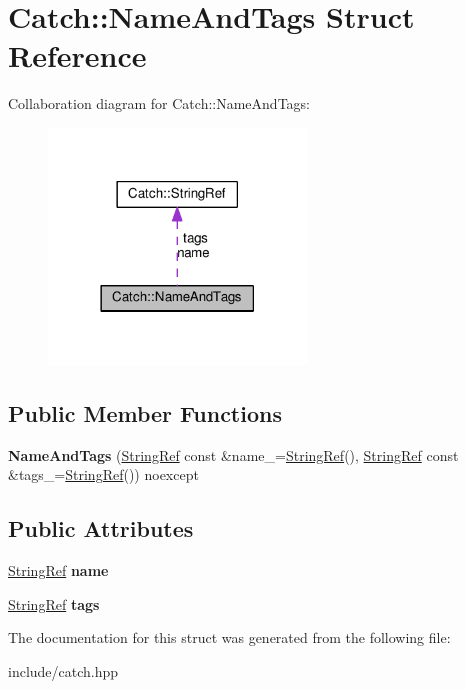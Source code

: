 \hypertarget{structCatch_1_1NameAndTags}{}\section{Catch\+:\+:Name\+And\+Tags Struct Reference}
\label{structCatch_1_1NameAndTags}


Collaboration diagram for Catch\+:\+:Name\+And\+Tags\+:
\nopagebreak
\begin{figure}[H]
\begin{center}
\leavevmode
\includegraphics[width=194pt]{structCatch_1_1NameAndTags__coll__graph}
\end{center}
\end{figure}
\subsection*{Public Member Functions}
\begin{DoxyCompactItemize}
\item 
{\bfseries Name\+And\+Tags} (\hyperlink{classCatch_1_1StringRef}{String\+Ref} const \&name\+\_\+=\hyperlink{classCatch_1_1StringRef}{String\+Ref}(), \hyperlink{classCatch_1_1StringRef}{String\+Ref} const \&tags\+\_\+=\hyperlink{classCatch_1_1StringRef}{String\+Ref}()) noexcept\hypertarget{structCatch_1_1NameAndTags_ab585111e615ce8c504a2b9630de8ee94}{}\label{structCatch_1_1NameAndTags_ab585111e615ce8c504a2b9630de8ee94}

\end{DoxyCompactItemize}
\subsection*{Public Attributes}
\begin{DoxyCompactItemize}
\item 
\hyperlink{classCatch_1_1StringRef}{String\+Ref} {\bfseries name}\hypertarget{structCatch_1_1NameAndTags_a7cbea60e0cebfa622c667008eb011420}{}\label{structCatch_1_1NameAndTags_a7cbea60e0cebfa622c667008eb011420}

\item 
\hyperlink{classCatch_1_1StringRef}{String\+Ref} {\bfseries tags}\hypertarget{structCatch_1_1NameAndTags_a74062ed1138834a348424eb7ed900c57}{}\label{structCatch_1_1NameAndTags_a74062ed1138834a348424eb7ed900c57}

\end{DoxyCompactItemize}


The documentation for this struct was generated from the following file\+:\begin{DoxyCompactItemize}
\item 
include/catch.\+hpp\end{DoxyCompactItemize}
